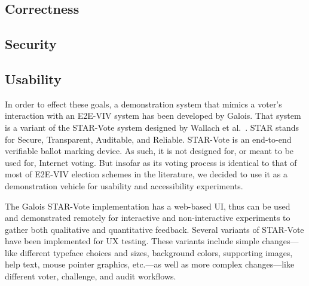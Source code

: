 

\subsection{Correctness}

\subsection{Security}


\subsection{Usability}



In order to effect these goals, a demonstration system that mimics a
voter's interaction with an E2E-VIV system has been developed by
Galois. That system is a variant of the STAR-Vote system designed by
Wallach et al.~\cite{star-vote}. STAR stands for Secure, Transparent,
Auditable, and Reliable. STAR-Vote is an end-to-end verifiable ballot
marking device. As such, it is not designed for, or meant to be used
for, Internet voting. But insofar as its voting process is identical
to that of most of E2E-VIV election schemes in the literature, we
decided to use it as a demonstration vehicle for usability and
accessibility experiments.

The Galois STAR-Vote implementation has a web-based UI, thus can be
used and demonstrated remotely for interactive and non-interactive
experiments to gather both qualitative and quantitative feedback.
Several variants of STAR-Vote have been implemented for UX testing.
These variants include simple changes---like different typeface
choices and sizes, background colors, supporting images, help text,
mouse pointer graphics, etc.---as well as more complex changes---like
different voter, challenge, and audit workflows.

